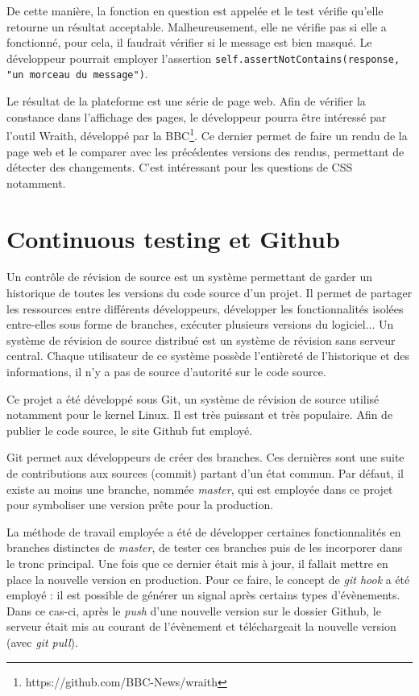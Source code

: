 \documentclass[a4paper,12pt]{article}
\begin{document}
De cette manière, la fonction en question est appelée et le test vérifie qu'elle
retourne un résultat acceptable. Malheureusement, elle ne vérifie pas si elle a fonctionné,
pour cela, il faudrait vérifier si le message est bien masqué. Le développeur pourrait
employer l'assertion \texttt{self.assertNotContains(response, "un morceau du message")}.

Le résultat de la plateforme est une série de page web. Afin de vérifier la constance
dans l'affichage des pages, le développeur pourra être intéressé par l'outil Wraith,
développé par la BBC\footnote{https://github.com/BBC-News/wraith}. Ce dernier
permet de faire un rendu de la page web et le comparer avec les précédentes versions
des rendus, permettant de détecter des changements. C'est intéressant pour les
questions de CSS notamment.


\section{Continuous testing et Github}

Un contrôle de révision de source est un système permettant de garder un historique
de toutes les versions du code source d'un projet. Il permet de partager les ressources
entre différents développeurs, développer les fonctionnalités isolées entre-elles sous
forme de branches, exécuter plusieurs versions du logiciel... Un système de révision
de source distribué est un système de révision sans serveur central. Chaque
utilisateur de ce système possède l'entièreté de l'historique et des informations,
il n'y a pas de source d'autorité sur le code source.

Ce projet a été développé sous Git, un système de révision de source utilisé notamment
pour le kernel Linux. Il est très puissant et très populaire. Afin de publier le code
source, le site Github fut employé.

Git permet aux développeurs de créer des branches. Ces dernières sont une suite de
contributions aux sources (commit) partant d'un état commun. Par défaut, il existe
au moins une branche, nommée \textit{master}, qui est employée dans ce projet
pour symboliser une version prête pour la production.

La méthode de travail employée a été de développer certaines fonctionnalités en branches
distinctes de \textit{master}, de tester ces branches puis de les incorporer dans
le tronc principal. Une fois que ce dernier était mis à jour, il fallait mettre en
place la nouvelle version en production. Pour ce faire, le concept de \textit{git hook}
a été employé : il est possible de générer un signal après certains types d'évènements.
Dans ce cas-ci, après le \textit{push} d'une nouvelle version sur le dossier Github,
le serveur était mis au courant de l'évènement et téléchargeait la nouvelle version (avec
\textit{git pull}).
\end{document}
